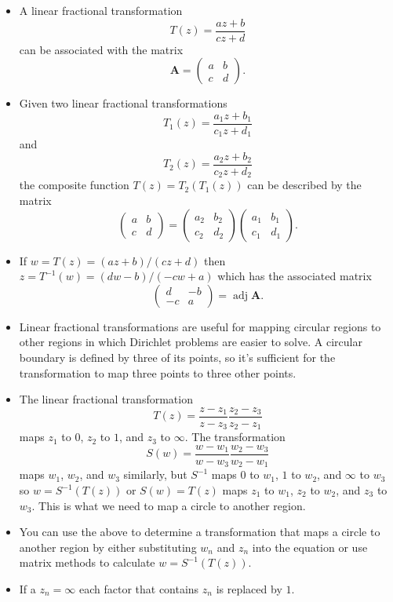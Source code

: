 \documentclass{article}
\newcommand{\adj}{\operatorname{adj}}
\renewcommand{\vec}[1]{\boldsymbol{\mathbf{#1}}}
\begin{document}
\begin{itemize}
  \item A linear fractional transformation \[T(z) = \frac{a z + b}{c z + d}\] can be associated with the matrix \[\vec{A} = \begin{pmatrix}
            a & b \\
            c & d
          \end{pmatrix}.\]

  \item Given two linear fractional transformations \[T_1(z) = \frac{a_1 z + b_1}{c_1 z + d_1}\] and \[T_2(z) = \frac{a_2 z + b_2}{c_2 z + d_2}\] the composite function $T(z) = T_2(T_1(z))$ can be described by the matrix \[\begin{pmatrix}
            a & b \\
            c & d
          \end{pmatrix} = \begin{pmatrix}
            a_2 & b_2 \\
            c_2 & d_2
          \end{pmatrix} \begin{pmatrix}
            a_1 & b_1 \\
            c_1 & d_1
          \end{pmatrix}.\]

  \item If $w = T(z) = (a z + b) / (c z + d)$ then $z = T^{-1}(w) = (d w - b) / (-c w + a)$ which has the associated matrix \[\begin{pmatrix}
            d  & -b \\
            -c & a
          \end{pmatrix} = \adj \vec{A}.\]

  \item Linear fractional transformations are useful for mapping circular regions to other regions in which Dirichlet problems are easier to solve. A circular boundary is defined by three of its points, so it's sufficient for the transformation to map three points to three other points.

  \item The linear fractional transformation \[T(z) = \frac{z - z_1}{z - z_3} \frac{z_2 - z_3}{z_2 - z_1}\] maps $z_1$ to $0$, $z_2$ to $1$, and $z_3$ to $\infty$. The transformation \[S(w) = \frac{w - w_1}{w - w_3} \frac{w_2 - w_3}{w_2 - w_1}\] maps $w_1$, $w_2$, and $w_3$ similarly, but $S^{-1}$ maps $0$ to $w_1$, $1$ to $w_2$, and $\infty$ to $w_3$ so $w = S^{-1}(T(z))$ or $S(w) = T(z)$ maps $z_1$ to $w_1$, $z_2$ to $w_2$, and $z_3$ to $w_3$. This is what we need to map a circle to another region.

  \item You can use the above to determine a transformation that maps a circle to another region by either substituting $w_n$ and $z_n$ into the equation or use matrix methods to calculate $w = S^{-1}(T(z))$.

  \item If a $z_n = \infty$ each factor that contains $z_n$ is replaced by $1$.
\end{itemize}
\end{document}
